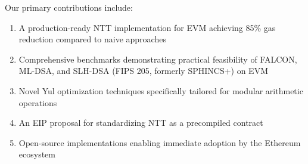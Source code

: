 Our primary contributions include:
\begin{enumerate}
\item A production-ready NTT implementation for EVM achieving 85\% gas reduction compared to naive approaches
\item Comprehensive benchmarks demonstrating practical feasibility of FALCON, ML-DSA, and SLH-DSA (FIPS 205, formerly SPHINCS+) on EVM
\item Novel Yul optimization techniques specifically tailored for modular arithmetic operations
\item An EIP proposal for standardizing NTT as a precompiled contract
\item Open-source implementations enabling immediate adoption by the Ethereum ecosystem
\end{enumerate}

